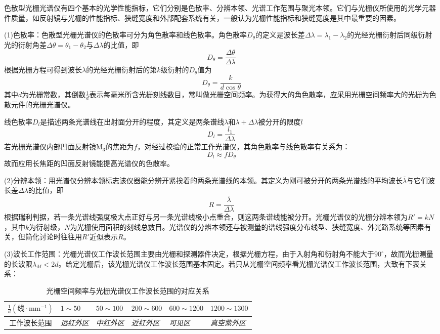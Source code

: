 \documentclass[UTF-8,twoside,cs4size]{ctexart}
\begin{document}
	色散型光栅光谱仪有四个基本的光学性能指标，它们分别是色散率、分辨本领、光谱工作范围与聚光本领。它们与光栅仪所使用的光学元器件质量，如反射镜与光栅的性能指标、狭缝宽度和外部配套系统有关，一般认为光栅性能指标和狭缝宽度是其中最重要的因素。
	
	(1)色散率：色散型光栅光谱仪的色散率可分为角色散率和线色散率。角色散率$ D_\theta $的定义是波长差$ \Delta\lambda=\lambda_1-\lambda_2 $的光经光栅衍射后同级衍射光的衍射角差$ \Delta\theta=\theta_1-\theta_2 $与$ \Delta\lambda $的比值，即
	\[D_\theta=\frac{\Delta\theta}{\Delta\lambda}\]
	根据光栅方程可得到波长$ \lambda $的光经光栅衍射后的第$ k $级衍射的$ D_\theta $值为
	\[D_\theta=\frac{k}{d\cos\theta}\]
	其中$ d $为光栅常数，其倒数$ \frac1d $表示每毫米所含光栅刻线数目，常叫做光栅空间频率。为获得大的角色散率，应采用光栅空间频率大的光栅为色散元件的光栅光谱仪。
	
	线色散率$ D_l $是描述两条光谱线在出射面分开的程度，其定义是两条谱线$ \lambda $和$ \lambda+\Delta\lambda $被分开的限度$ l $
	\[D_l=\frac{l_1}{\Delta\lambda}\]
	若光栅光谱仪内部凹面反射镜$ \mathrm M_3 $的焦距为$ f $，对经过校验的正常工作光谱仪，其角色散率与线色散率有关系为：
	\[D_l\approx fD_\theta\]
	故而应用长焦距的凹面反射镜能提高光谱仪的色散率。
	
	(2)分辨本领：用光谱仪分辨本领标志该仪器能分辨开紧挨着的两条光谱线的本领。其定义为刚可被分开的两条光谱线的平均波长$ \bar\lambda $与它们波长差$ \Delta\lambda $的比值，即
	\[R=\frac{\bar\lambda}{\Delta\lambda}\]
	根据瑞利判据，若一条光谱线强度极大点正好与另一条光谱线极小点重合，则这两条谱线能被分开。光栅光谱仪的光栅分辨本领为$ R'=kN $，其中$ k $为衍射级，$ N $为光栅使用面积的刻线总数目。光谱仪的分辨本领还与被测量的谱线强度分布线型、狭缝宽度、外光路系统等因素有关，但简化讨论时往往用$ R' $近似表示$ R $。
	
	(3)波长工作范围：光栅光谱仪工作波长范围主要由光栅和探测器件决定，根据光栅方程，由于入射角和衍射角不能大于$ 90^\circ $，故而光栅测量的长波限$ \lambda_M<2d $。给定光栅后，该光栅光谱仪工作波长范围基本固定。若只从光栅空间频率看光栅光谱仪工作波长范围，大致有下表关系：
	\begin{table}[h]
		\centering
		\renewcommand\arraystretch{1.5}
		\begin{tabularx}{\textwidth}{cYYYYY}
			\hline
			$ \frac1d(\text{线}\cdot\mathrm{mm}^{-1}) $ & $1\sim50$ & $ 50\sim 100 $ & $ 200\sim 600 $ & $ 600\sim1200 $ & $ 1200\sim 1300 $\\
			\hline
			工作波长范围 &\textit{远红外区}&\textit{中红外区}&\textit{近红外区}&\textit{可见区}&\textit{真空紫外区}\\
			\hline
		\end{tabularx}
		\caption{光栅空间频率与光栅光谱仪工作波长范围的对应关系}
	\end{table}
\end{document}
